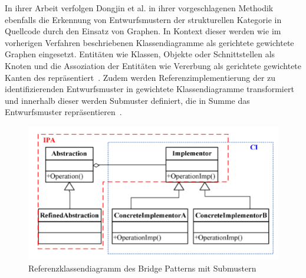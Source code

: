 \pagebreak

In ihrer Arbeit verfolgen Dongjin et al. in ihrer vorgeschlagenen Methodik ebenfalls die Erkennung von Entwurfsmustern der strukturellen Kategorie in Quellcode durch den Einsatz von Graphen. In Kontext dieser werden wie im vorherigen Verfahren beschriebenen Klassendiagramme als gerichtete gewichtete Graphen eingesetzt.
Entitäten wie Klassen, Objekte oder Schnittstellen als Knoten und die Assoziation der Entitäten wie Vererbung als gerichtete gewichtete Kanten des repräsentiert~\cite[S. 582]{6649882}.
Zudem werden Referenzimplementierung der zu identifizierenden Entwurfsmuster in gewichtete Klassendiagramme transformiert und innerhalb dieser werden Submuster definiert, die in Summe das Entwurfsmuster repräsentieren~\cite[S. 580]{6649882}.

\begin{figure}[h]
    \centering
    \includegraphics[scale=0.75]{figures/struture_bridge.png}
    \caption{Referenzklassendiagramm des Bridge Patterns mit Submustern}
    \label{fig:structure_bridge}
\end{figure}

